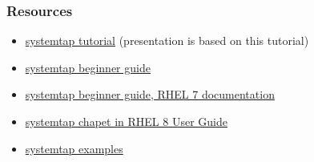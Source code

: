 \documentclass[10pt,utf8]{beamer}
\begin{document}
\begin{frame}
	\frametitle{Resources}
	\begin{itemize}
		\item \color{blue}\href{http://sourceware.org/systemtap/tutorial.pdf}{systemtap tutorial} \color{black}(presentation is based on this tutorial)
		\item \color{blue}\href{https://sourceware.org/systemtap/SystemTap_Beginners_Guide/}{systemtap beginner guide}
		\item \href{https://access.redhat.com/documentation/en-us/red\_hat\_enterprise_linux/7/html-single/systemtap\_beginners\_guide/index}{systemtap beginner guide, RHEL 7 documentation}
		\item \href{https://access.redhat.com/documentation/en-us/red_hat_developer\_toolset/8/html/user\_guide/chap-systemtap}{systemtap chapet in RHEL 8 User Guide}
		\item \href{https://sourceware.org/systemtap/examples/}{systemtap examples}
	\end{itemize}
\end{frame}
\end{document}
